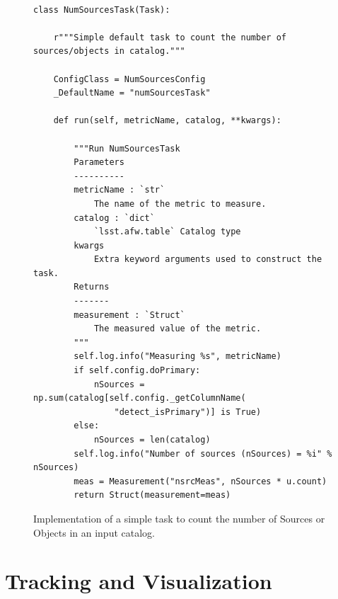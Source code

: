 \begin{figure}[!htp]

  \lstset{language=python}
  \begin{lstlisting}
  
class NumSourcesTask(Task):

    r"""Simple default task to count the number of sources/objects in catalog."""

    ConfigClass = NumSourcesConfig
    _DefaultName = "numSourcesTask"

    def run(self, metricName, catalog, **kwargs):

        """Run NumSourcesTask
        Parameters
        ----------
        metricName : `str`
            The name of the metric to measure.
        catalog : `dict`
            `lsst.afw.table` Catalog type
        kwargs
            Extra keyword arguments used to construct the task.
        Returns
        -------
        measurement : `Struct`
            The measured value of the metric.
        """
        self.log.info("Measuring %s", metricName)
        if self.config.doPrimary:
            nSources = np.sum(catalog[self.config._getColumnName(
                "detect_isPrimary")] is True)
        else:
            nSources = len(catalog)
        self.log.info("Number of sources (nSources) = %i" % nSources)
        meas = Measurement("nsrcMeas", nSources * u.count)
        return Struct(measurement=meas)    \end{lstlisting}
        
  \caption{Implementation of a simple task to count the number of Sources or Objects in an input catalog. }

  \label{fig:num_sources_task}
  \par\medskip
\end{figure}

\section{Tracking and Visualization} \label{sec:tracking}

